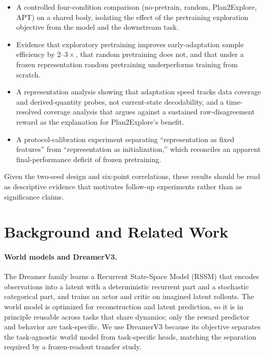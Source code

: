 \documentclass{article}
\begin{document}
\begin{itemize}
\item A controlled four-condition comparison (no-pretrain, random, Plan2Explore,
APT) on a shared body, isolating the effect of the pretraining
exploration objective from the model and the downstream task.
\item Evidence that exploratory pretraining improves early-adaptation sample
efficiency by $2$--$3\times$, that random pretraining does not, and that under a
frozen representation random pretraining underperforms training from scratch.
\item A representation analysis showing that adaptation speed tracks data
coverage and derived-quantity probes, not current-state decodability, and a
time-resolved coverage analysis that argues against a sustained raw-disagreement
reward as the explanation for Plan2Explore's benefit.
\item A protocol-calibration experiment separating ``representation as fixed
features'' from ``representation as initialization,'' which reconciles an
apparent final-performance deficit of frozen pretraining.
\end{itemize}

Given the two-seed design and six-point correlations, these results should be
read as descriptive evidence that motivates follow-up experiments rather than as
significance claims.

\section{Background and Related Work}

\paragraph{World models and DreamerV3.}
The Dreamer family \citep{hafner2020dreamer, hafner2021dreamerv2,
hafner2023dreamerv3} learns a Recurrent State-Space Model (RSSM)
\citep{hafner2019planet} that encodes observations into a latent with a
deterministic recurrent part and a stochastic categorical part, and trains an
actor and critic on imagined latent rollouts. The world model is optimized for
reconstruction and latent prediction, so it is in principle reusable across
tasks that share dynamics; only the reward predictor and behavior are
task-specific. We use DreamerV3 because its objective separates the
task-agnostic world model from task-specific heads, matching the separation
required by a frozen-readout transfer study.
\end{document}
